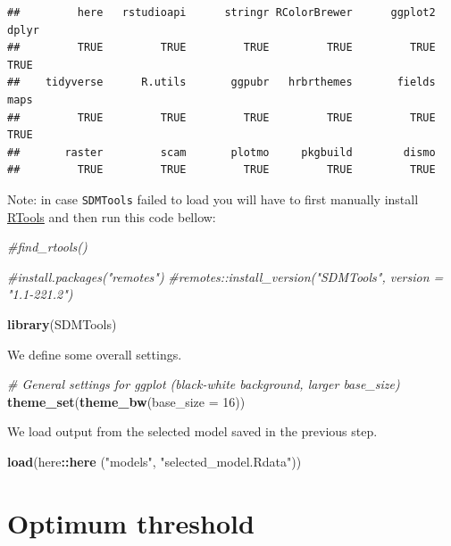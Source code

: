 \documentclass[
]{book}
\newenvironment{Shaded}{\begin{snugshade}}{\end{snugshade}}
\newcommand{\AttributeTok}[1]{\textcolor[rgb]{0.13,0.29,0.53}{#1}}
\newcommand{\CommentTok}[1]{\textcolor[rgb]{0.56,0.35,0.01}{\textit{#1}}}
\newcommand{\DecValTok}[1]{\textcolor[rgb]{0.00,0.00,0.81}{#1}}
\newcommand{\FunctionTok}[1]{\textcolor[rgb]{0.13,0.29,0.53}{\textbf{#1}}}
\newcommand{\NormalTok}[1]{#1}
\newcommand{\SpecialCharTok}[1]{\textcolor[rgb]{0.81,0.36,0.00}{\textbf{#1}}}
\newcommand{\StringTok}[1]{\textcolor[rgb]{0.31,0.60,0.02}{#1}}
\begin{document}
\begin{verbatim}
##         here   rstudioapi      stringr RColorBrewer      ggplot2        dplyr 
##         TRUE         TRUE         TRUE         TRUE         TRUE         TRUE 
##    tidyverse      R.utils       ggpubr   hrbrthemes       fields         maps 
##         TRUE         TRUE         TRUE         TRUE         TRUE         TRUE 
##       raster         scam       plotmo     pkgbuild        dismo 
##         TRUE         TRUE         TRUE         TRUE         TRUE
\end{verbatim}

Note: in case \texttt{SDMTools} failed to load you will have to first manually install \href{https://cran.r-project.org/bin/windows/Rtools/history.html}{RTools} and then run this code bellow:

\begin{Shaded}
\begin{Highlighting}[]
\CommentTok{\#find\_rtools()}
 
\CommentTok{\#install.packages("remotes")}
\CommentTok{\#remotes::install\_version("SDMTools", version = "1.1{-}221.2")}

\FunctionTok{library}\NormalTok{(SDMTools)}
\end{Highlighting}
\end{Shaded}

We define some overall settings.

\begin{Shaded}
\begin{Highlighting}[]
\CommentTok{\# General settings for ggplot (black{-}white background, larger base\_size)}
\FunctionTok{theme\_set}\NormalTok{(}\FunctionTok{theme\_bw}\NormalTok{(}\AttributeTok{base\_size =} \DecValTok{16}\NormalTok{))}
\end{Highlighting}
\end{Shaded}

We load output from the selected model saved in the previous step.

\begin{Shaded}
\begin{Highlighting}[]
\FunctionTok{load}\NormalTok{(here}\SpecialCharTok{::}\FunctionTok{here}\NormalTok{ (}\StringTok{"models"}\NormalTok{, }\StringTok{"selected\_model.Rdata"}\NormalTok{))}
\end{Highlighting}
\end{Shaded}

\section{Optimum threshold}\label{optimum-threshold}
\end{document}
